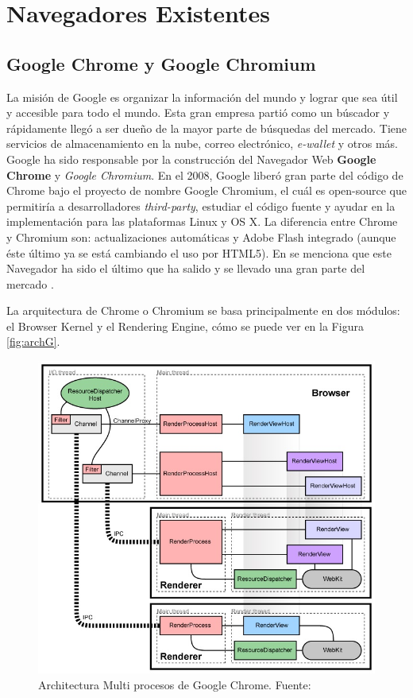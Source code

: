 \section{Navegadores Existentes}
\label{chap3:BrowExis}

    \subsection{Google Chrome y Google Chromium}
    \label{chap3:GC}
    La misión de Google es organizar la información del mundo y lograr que sea útil y accesible para todo el mundo. Esta gran empresa partió como un búscador y rápidamente llegó a ser dueño de la mayor parte de búsquedas del mercado. Tiene servicios de almacenamiento en la nube, correo electrónico, \textit{e-wallet} y otros más. Google ha sido responsable por la construcción del Navegador Web \textbf{Google Chrome} y \textit{Google Chromium}. En el 2008, Google liberó gran parte del código de Chrome bajo el proyecto de nombre Google Chromium, el cuál es open-source que permitiría a desarrolladores \textit{third-party}, estudiar el código fuente y ayudar en la implementación para las plataformas Linux y OS X. La diferencia entre Chrome y Chromium son: actualizaciones automáticas y Adobe Flash integrado (aunque éste último ya se está cambiando el uso por HTML5). En  \cite{EvolutionofWeb} se menciona que este Navegador ha sido el último que ha salido y se llevado una gran parte del mercado \cite{statBrow}.

    La arquitectura de Chrome o Chromium se basa principalmente en dos módulos: el Browser Kernel y el Rendering Engine, cómo se puede ver en la Figura \ref{fig:archG}.

    \begin{figure}[h!t]
        \centering
        \includegraphics[scale=0.5]{figures/archGC.jpg}
        \caption{Architectura Multi procesos de Google Chrome. Fuente: \cite{multiProcGC}}
        \label{fig:archGC}
    \end{figure}

